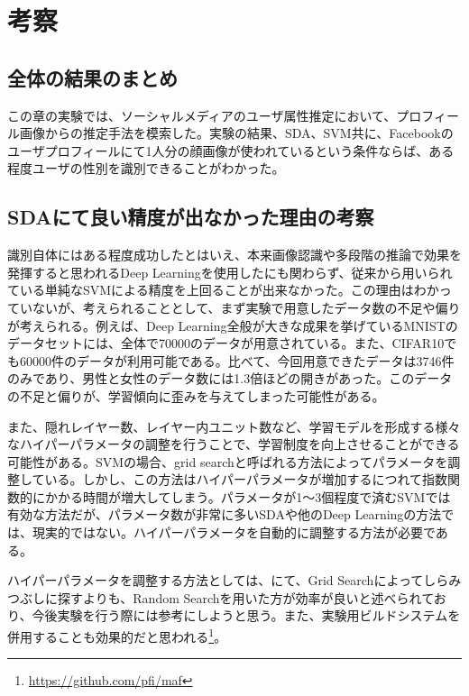 \section{考察}
\subsection{全体の結果のまとめ}
この章の実験では、ソーシャルメディアのユーザ属性推定において、プロフィール画像からの推定手法を模索した。実験の結果、SDA、SVM共に、Facebookのユーザプロフィールにて1人分の顔画像が使われているという条件ならば、ある程度ユーザの性別を識別できることがわかった。\par
\subsection{SDAにて良い精度が出なかった理由の考察}
識別自体にはある程度成功したとはいえ、本来画像認識や多段階の推論で効果を発揮すると思われるDeep Learningを使用したにも関わらず、従来から用いられている単純なSVMによる精度を上回ることが出来なかった。この理由はわかっていないが、考えられることとして、まず実験で用意したデータ数の不足や偏りが考えられる。例えば、Deep Learning全般が大きな成果を挙げているMNISTのデータセットには、全体で70000のデータが用意されている。また、CIFAR10でも60000件のデータが利用可能である。比べて、今回用意できたデータは3746件のみであり、男性と女性のデータ数には1.3倍ほどの開きがあった。このデータの不足と偏りが、学習傾向に歪みを与えてしまった可能性がある。\par
また、隠れレイヤー数、レイヤー内ユニット数など、学習モデルを形成する様々なハイパーパラメータの調整を行うことで、学習制度を向上させることができる可能性がある。SVMの場合、grid searchと呼ばれる方法によってパラメータを調整している。しかし、この方法はハイパーパラメータが増加するにつれて指数関数的にかかる時間が増大してしまう。パラメータが1〜3個程度で済むSVMでは有効な方法だが、パラメータ数が非常に多いSDAや他のDeep Learningの方法では、現実的ではない。ハイパーパラメータを自動的に調整する方法が必要である。\par
ハイパーパラメータを調整する方法としては、\cite{bengio2012practical}にて、Grid Searchによってしらみつぶしに探すよりも、Random Searchを用いた方が効率が良いと述べられており、今後実験を行う際には参考にしようと思う。また、実験用ビルドシステムを併用することも効果的だと思われる\footnote{\url{https://github.com/pfi/maf}}。

